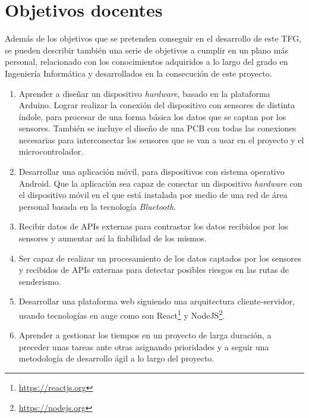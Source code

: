 \section{Objetivos docentes}

Además de los objetivos que se pretenden conseguir en el desarrollo de este \ac{TFG}, se pueden describir también una serie de objetivos a cumplir en un plano más personal, relacionado con los conocimientos adquiridos a lo largo del grado en Ingeniería Informática y desarrollados en la consecución de este proyecto.

\begin{enumerate}[1)]

\item Aprender a diseñar un dispositivo \textit{hardware}, basado en la plataforma Arduino. Lograr realizar la conexión del dispositivo con sensores de distinta índole, para procesar de una forma básica los datos que se captan por los sensores. También se incluye el diseño de una \ac{PCB} con todas las conexiones necesarias para interconectar los sensores que se van a usar en el proyecto y el microcontrolador. 

\item Desarrollar una aplicación móvil, para dispositivos con sistema operativo Android. Que la aplicación sea capaz de conectar un dispositivo \textit{hardware} con el dispositivo móvil en el que está instalada por medio de una red de área personal basada en la tecnología \textit{Bluetooth}.

\item Recibir datos de \acs{API}s externas para contrastar los datos recibidos por los sensores y aumentar así la fiabilidad de los mismos.

\item Ser capaz de realizar un procesamiento de los datos captados por los sensores y recibidos de \acs{API}s externas para detectar posibles riesgos en las rutas de senderismo.

\item Desarrollar una plataforma web siguiendo una arquitectura cliente-servidor, usando tecnologías en auge como son React\footnote{\url{https://reactjs.org}} y NodeJS\footnote{\url{https://nodejs.org}}.

\item Aprender a gestionar los tiempos en un proyecto de larga duración, a preceder unas tareas ante otras asignando prioridades y a seguir una metodología de desarrollo ágil a lo largo del proyecto.
\end{enumerate}

